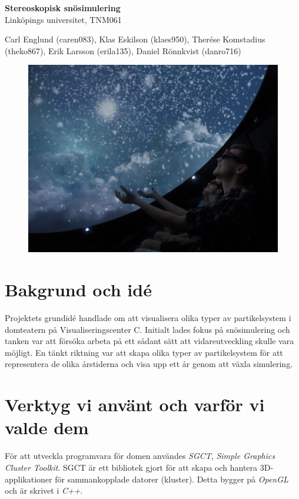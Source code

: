 \documentclass[12pt,a4paper]{article}
\begin{document}
\begin{center}

	{ \huge \bfseries Stereoskopisk snösimulering \\[0.2cm] }
		Linköpings universitet, TNM061
		\vskip 0.4cm

	\begin{minipage}{0.8\textwidth}
	\centering
		Carl Englund (caren083),
		Klas Eskilson (klaes950),
		Therése Komstadius (theko867),
		Erik Larsson (erila135),
		Daniel Rönnkvist (danro716)
	\end{minipage}

\end{center}

\begin{figure}[h!]
	\centering
		\includegraphics[width=1\textwidth]{modellcarl.jpg}
\end{figure}

\section*{Bakgrund och idé}

	Projektets grundidé handlade om att visualisera olika typer av partikelsystem i domteatern på Visualiseringscenter C. Initialt lades fokus på snösimulering och tanken var att försöka arbeta på ett sådant sätt att vidareutveckling skulle vara möjligt. En tänkt riktning var att skapa olika typer av partikelsystem för att representera de olika årstiderna och visa upp ett år genom att växla simulering.

\section*{Verktyg vi använt och varför vi valde dem}
	För att utveckla programvara för domen användes \emph{SGCT}, \emph{Simple Graphics Cluster Toolkit}. SGCT är ett bibliotek gjort för att skapa och hantera 3D-applikationer för sammankopplade datorer (kluster). Detta bygger på \emph{OpenGL} och är skrivet i \emph{C++}.
\end{document}
